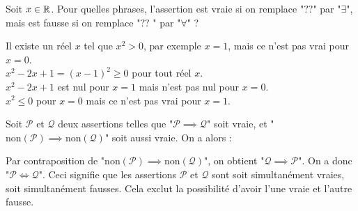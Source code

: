\begin{question}
Soit $x\in\mathbb{R}$. 
Pour quelles phrases, l'assertion est vraie si on remplace "$??$" par "$\exists$", mais est fausse si on remplace "$??$ " par "$\forall$" ?
\begin{answers} 
\end{answers}
\begin{explanations} 
Il existe un réel $x$ tel que $x^2>0$, par exemple $x=1$, mais ce n'est pas vrai pour $x=0$.\\
$x^2-2x+1=(x-1)^2\ge 0$ pour tout réel $x$.\\
 $x^2-2x+1$ est nul pour $x=1$ mais n'est pas nul pour $x=0$. \\
 $x^2\le 0$ pour $x=0$ mais ce n'est pas vrai pour $x=1$.
\end{explanations}
\end{question}


\begin{question}
Soit $\mathcal{P}$ et $\mathcal{Q}$ deux assertions telles que "$\mathcal{P} \implies \mathcal{Q}$" soit vraie, et "$\text{non}(\mathcal{P}) \implies \text{non}(\mathcal{Q})$" soit aussi vraie. On a alors :
\begin{answers} 
\end{answers}
\begin{explanations} 
Par contraposition de "$\text{non}(\mathcal{P}) \implies \text{non}(\mathcal{Q})$", on obtient "$\mathcal{Q} \implies \mathcal{P}$". On a donc "$\mathcal{P} \iff \mathcal{Q}$". Ceci signifie que les assertions $\mathcal{P}$ et $\mathcal{Q}$ sont soit simultanément vraies, soit simultanément fausses. Cela exclut la possibilité d'avoir l'une vraie et l'autre fausse.
\end{explanations}
\end{question}


